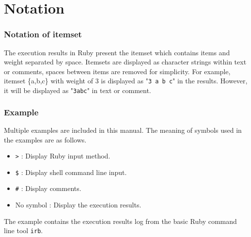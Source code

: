 \section{Notation\label{sect:notation}}

\subsubsection*{Notation of itemset}
The execution results in Ruby present the itemset which contains items and weight separated by space. Itemsets are displayed as character strings within text or comments, spaces between items are removed for simplicity.  For example, itemset \{a,b,c\} with weight of 3 is displayed as "\verb|3 a b c|" in the results. However, it will be displayed as "\verb|3abc|" in text or comment.

\subsubsection*{Example}

Multiple examples are included in this manual. The meaning of symbols used in the examples are as follows.\begin{itemize}
\item \verb|>| : Display Ruby input method.
\item \verb|$| : Display shell command line input.
\item \verb|#| : Display comments.
\item No symbol : Display the execution results.
\end{itemize}

The example contains the execution results log from the basic Ruby command line tool \verb|irb|. 


%



